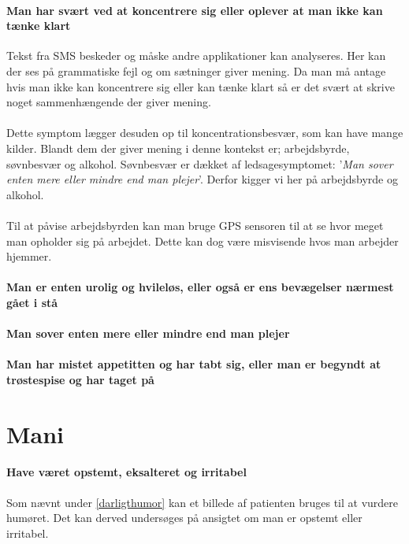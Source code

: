 \paragraph{Man har svært ved at koncentrere sig eller oplever at man ikke kan tænke klart}
Tekst fra SMS beskeder og måske andre applikationer kan analyseres. Her kan der ses på grammatiske fejl og om sætninger giver mening. Da man må antage hvis man ikke kan koncentrere sig eller kan tænke klart så er det svært at skrive noget sammenhængende der giver mening.
\\
\\
Dette symptom lægger desuden op til koncentrationsbesvær, som kan have mange kilder. Blandt dem der giver mening i denne kontekst er; arbejdsbyrde, søvnbesvær og alkohol.\cite{koncentration}
Søvnbesvær er dækket af ledsagesymptomet: '\textit{Man sover enten mere eller mindre end man plejer}'. Derfor kigger vi her på arbejdsbyrde og alkohol.
\\
\\
Til at påvise arbejdsbyrden kan man bruge GPS sensoren til at se hvor meget man opholder sig på arbejdet. Dette kan dog være misvisende hvos man arbejder hjemmer.

\paragraph{Man er enten urolig og hvileløs, eller også er ens bevægelser nærmest gået i stå}
\paragraph{Man sover enten mere eller mindre end man plejer}
\paragraph{Man har mistet appetitten og har tabt sig, eller man er begyndt at trøstespise og har taget på}


\section{Mani}

\paragraph{Have været opstemt, eksalteret og irritabel}
Som nævnt under \cref{darligthumor} kan et billede af patienten bruges til at vurdere humøret. 
Det kan derved undersøges på ansigtet om man er opstemt eller irritabel.

